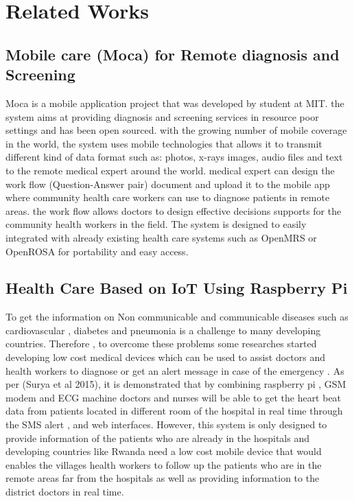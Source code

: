 \chapter{Related Works}
\section{ Mobile care (Moca) for Remote diagnosis and Screening}
Moca is a mobile application project that was developed by student at MIT. the system aims at providing diagnosis and screening services in resource poor settings and has been open sourced. with the growing number of mobile coverage in the world, the system uses mobile technologies that allows it to transmit different kind of data format such as: photos, x-rays images, audio files and text to the remote medical expert around the world. medical expert can design the work flow (Question-Answer pair) document and upload it to the mobile app where community health care workers can use to diagnose patients in remote areas. the work flow allows doctors to design effective decisions supports for the community health workers in the field. The system is designed to easily integrated with already existing health care systems such as OpenMRS or OpenROSA for portability and easy access\cite{celi2009mobile}.

\section{Health Care Based on IoT Using Raspberry Pi }

To get the information on Non communicable and communicable diseases such as  cardiovascular , diabetes and pneumonia is a challenge to many developing countries. Therefore , to overcome these problems some researches  started developing low cost medical devices which can be used to assist doctors and health workers to diagnose  or get an alert message in case of the emergency . As per (Surya et al 2015), it is demonstrated that by combining raspberry pi , GSM modem and ECG machine doctors and nurses will be able to get  the  heart beat data from patients located in different room of the hospital  in real time through the SMS alert , and web interfaces. However, this system is only designed to provide information of the patients who are already in the hospitals and developing countries like Rwanda need  a  low cost  mobile device that would enables the villages health workers to  follow up the patients who are in the  remote areas far from the hospitals  as well as providing information to the district doctors in real time\cite{msuryadeekshithguptavamsikrishnapatchavavirginiamenezes2015}. 

